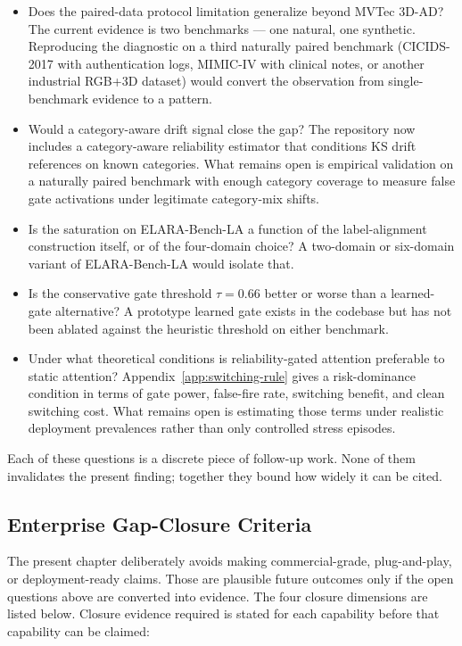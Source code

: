 \documentclass[11pt]{article}
\newcommand{\benchmark}{ELARA-Bench-LA}
\begin{document}
\begin{itemize}
  \item Does the paired-data protocol limitation generalize beyond MVTec 3D-AD?
  The current evidence is two benchmarks --- one natural, one synthetic.
  Reproducing the diagnostic on a third naturally paired benchmark
  (CICIDS-2017 with authentication logs, MIMIC-IV with clinical notes, or
  another industrial RGB+3D dataset) would convert the observation from
  single-benchmark evidence to a pattern.
  \item Would a category-aware drift signal close the gap? The repository now
  includes a category-aware reliability estimator that conditions KS drift
  references on known categories. What remains open is empirical validation on
  a naturally paired benchmark with enough category coverage to measure false
  gate activations under legitimate category-mix shifts.
  \item Is the saturation on \benchmark{} a function of the
  label-alignment construction itself, or of the four-domain choice?
  A two-domain or six-domain variant of \benchmark{} would isolate that.
  \item Is the conservative gate threshold $\tau=0.66$ better or worse
  than a learned-gate alternative? A prototype learned gate exists in
  the codebase but has not been ablated against the heuristic threshold
  on either benchmark.
  \item Under what theoretical conditions is reliability-gated attention
  preferable to static attention? Appendix~\ref{app:switching-rule} gives a
  risk-dominance condition in terms of gate power, false-fire rate, switching
  benefit, and clean switching cost. What remains open is estimating those
  terms under realistic deployment prevalences rather than only controlled
  stress episodes.
\end{itemize}

Each of these questions is a discrete piece of follow-up work. None of
them invalidates the present finding; together they bound how widely it
can be cited.

\subsection{Enterprise Gap-Closure Criteria}

The present chapter deliberately avoids making commercial-grade, plug-and-play, or
deployment-ready claims. Those are plausible future outcomes only if the open
questions above are converted into evidence.
The four closure dimensions are listed below. Closure evidence required is
stated for each capability before that capability can be claimed:
\end{document}
